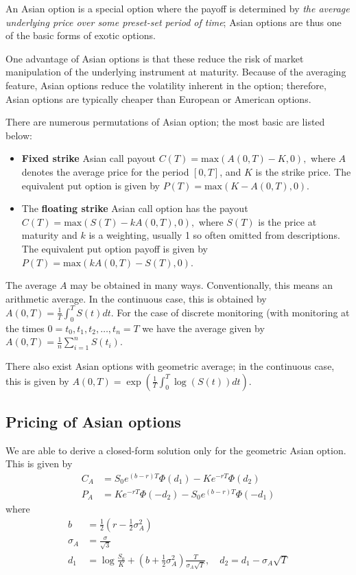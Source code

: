 An Asian option is a special option where the payoff is determined by \emph{the average underlying price over some preset-set period of time}; 
Asian options are thus one of the basic forms of exotic options. 

One advantage of Asian options is that these reduce the risk of market manipulation of the underlying instrument at maturity.
Because of the averaging feature, Asian options reduce the volatility inherent in the option; therefore, Asian options are typically cheaper than European or American options. 

There are numerous permutations of Asian option; the most basic are listed below:
\begin{itemize}
\item \textbf{Fixed strike} Asian call payout
$C(T)={\text{max}}\left(A(0,T)-K,0\right),$
where $A$ denotes the average price for the period $[0, T]$, and $K$ is the strike price. 
The equivalent put option is given by
$P(T)={\text{max}}\left(K-A(0,T),0\right)$.

\item The \textbf{floating strike} Asian call option has the payout
$C(T)={\text{max}}\left(S(T)-kA(0,T),0\right),$
where $S(T)$ is the price at maturity and $k$ is a weighting, usually 1 so often omitted from descriptions.
The equivalent put option payoff is given by
$P(T)={\text{max}}\left(kA(0,T)-S(T),0\right)$.
\end{itemize}

The average $A$ may be obtained in many ways. Conventionally, this means an arithmetic average. In the continuous case, this is obtained by
$A(0,T)={\frac  {1}{T}}\int _{{0}}^{{T}}S(t)dt$.
For the case of discrete monitoring (with monitoring at the times 
$0=t_{0},t_{1},t_{2},\dots ,t_{n}=T$ we have the average given by
$A(0,T)=\frac{1}{n}\sum_{i=1}^{n}S(t_{i})$.

There also exist Asian options with geometric average; in the continuous case, this is given by
$A(0,T)=\exp \left(\frac{1}{T}\int_0^T \log(S(t))dt\right)$.

\subsection{Pricing of Asian options}
We are able to derive a closed-form solution only for the geometric Asian option.
This is given by 
\begin{equation}
\begin{aligned}
C_A&=S_{0}e^{(b-r)T}\Phi (d_{1})-Ke^{-rT}\Phi (d_{2})\\
P_A&=Ke^{-rT}\Phi (-d_{2})-S_{0}e^{(b-r)T}\Phi (-d_{1})
\end{aligned}
\end{equation}
where 
\begin{equation}
\begin{aligned}
b&=\frac{1}{2}\left(r-\frac{1}{2}\sigma _A^2\right)\\
\sigma _A&=\frac{\sigma}{\sqrt{3}} \\
d_1 &=\log{\frac{S_0}{K}}+\left(b+\frac{1}{2}\sigma^2_A\right)\frac{T}{\sigma_A \sqrt{T}},\quad d_2=d_1-\sigma_A \sqrt {T}
\end{aligned}
\end{equation}

